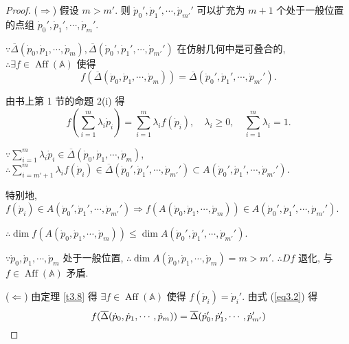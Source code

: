 \documentclass{ctexart}
\begin{document}
\begin{proof}
    ($\Rightarrow$) 假设 $m>m'$. 则 $\dot{p}_0',\dot{p}_1',\cdots,\dot{p}_{m'}'$ 可以扩充为 $m+1$ 个处于一般位置的点组 $\dot{p}_0',\dot{p}_1',\cdots,\dot{p}_m'$.
    
    $\because\overline{\Delta}(\dot{p}_0,\dot{p}_1,\cdots,\dot{p}_m),\overline{\Delta}(\dot{p}_0',\dot{p}_1',\cdots,\dot{p}_{m'}')$ 在仿射几何中是可叠合的, $\therefore\exists f\in\operatorname{Aff}(\mathbb{A})$ 使得
    \begin{equation}\label{eq3.2}
        f(\overline{\Delta}(\dot{p}_0,\dot{p}_1,\cdots,\dot{p}_m))=\overline{\Delta}(\dot{p}_0',\dot{p}_1',\cdots,\dot{p}_{m'}').
    \end{equation}


    由书上第 1 节的命题 2(i) 得
    \[f\left(\sum\limits_{i=1}^m\lambda_i\dot{p}_i\right)=\sum\limits_{i=1}^m\lambda_if(\dot{p}_i),\quad\lambda_i\geq0,\quad\sum\limits_{i=1}^m\lambda_i=1.\]

    $\because\sum\limits_{i=1}^m\lambda_i\dot{p}_i\in\overline{\Delta}(\dot{p}_0,\dot{p}_1,\cdots,\dot{p}_m)$, $\therefore\sum\limits_{i=m'+1}^m\lambda_if(\dot{p}_i)\in\overline{\Delta}(\dot{p}_0',\dot{p}_1',\cdots,\dot{p}_{m'}')\subset A(\dot{p}_0',\dot{p}_1',\cdots,\dot{p}_{m'}')$.

    特别地, $f(\dot{p}_i)\in A(\dot{p}_0',\dot{p}_1',\cdots,\dot{p}_{m'}')\Rightarrow f(A(\dot{p}_0,\dot{p}_1,\cdots,\dot{p}_m))\in A(\dot{p}_0',\dot{p}_1',\cdots,\dot{p}_{m'}')$.
    
    $\therefore\dim f(A(\dot{p}_0,\dot{p}_1,\cdots,\dot{p}_m))\leq\dim A(\dot{p}_0',\dot{p}_1',\cdots,\dot{p}_{m'}')$.

    $\because\dot{p}_0,\dot{p}_1,\cdots,\dot{p}_m$ 处于一般位置, $\therefore\dim A(\dot{p}_0,\dot{p}_1,\cdots,\dot{p}_m)=m>m'$. $\therefore Df$ 退化, 与 $f\in\operatorname{Aff}(\mathbb{A})$ 矛盾.

    ($\Leftarrow$) 由定理 \ref{t3.8} 得 $\exists f\in\operatorname{Aff}(\mathbb{A})$ 使得 $f(\dot{p}_i)=\dot{p}_i'$. 由式 (\ref{eq3.2}) 得
    \[f(\overline{\Delta}(\dot{p}_0,\dot{p}_1,\cdots,\dot{p}_m))=\overline{\Delta}(\dot{p}_0',\dot{p}_1',\cdots,\dot{p}_{m'}')\qedhere\]
\end{proof}
\end{document}
